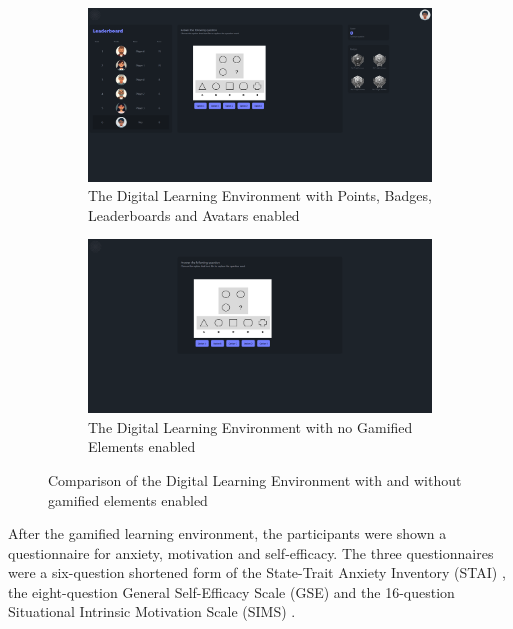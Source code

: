 \begin{figure}[H]
  \centering
  \begin{subfigure}[t]{0.4\textwidth}
    \includegraphics[width=\textwidth]{img/question_screen.png}
    \caption{The Digital Learning Environment with Points, Badges, Leaderboards and Avatars enabled}
    \label{fig:figureScreenEnabled}
  \end{subfigure}
  \hspace{5mm}
  \begin{subfigure}[t]{0.4\textwidth}
    \includegraphics[width=\textwidth]{img/question_screen_no_elements.png}
    \caption{The Digital Learning Environment with no Gamified Elements enabled}
    \label{fig:figureScreenDisabled}
  \end{subfigure}
  \caption{Comparison of the Digital Learning Environment with and without gamified elements enabled}
\end{figure}

After the gamified learning environment, the participants were shown a questionnaire for anxiety, motivation and self-efficacy. The three questionnaires were a six-question shortened form of the State-Trait Anxiety Inventory (STAI) \parencite{marteauDevelopmentSixitemShortform1992}, the eight-question General Self-Efficacy Scale (GSE) \parencite{guayAssessmentSituationalIntrinsic2000} and the 16-question Situational Intrinsic Motivation Scale (SIMS) \parencite{chenValidationNewGeneral2001}.

